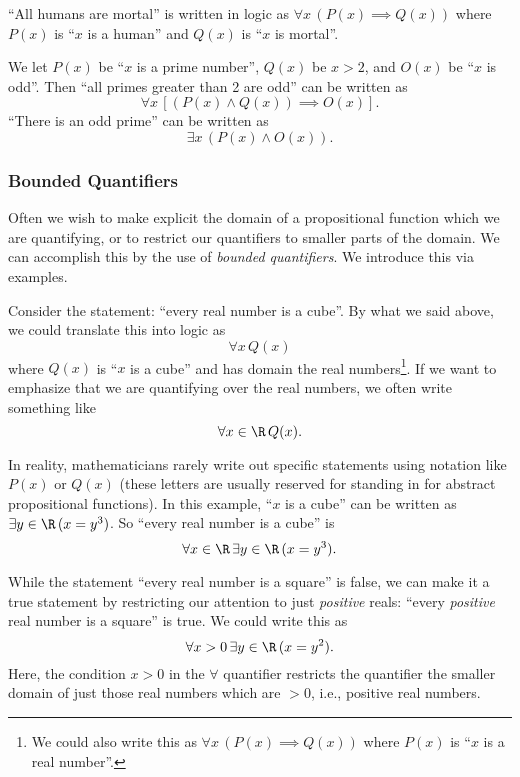 \begin{example}
``All humans are mortal'' is written in logic as $\forall x \, (P(x) \implies Q(x))$ where $P(x)$  is ``$x$ is a human'' and $Q(x)$ is ``$x$ is mortal''.
\end{example}

\begin{example}
We let $P(x)$ be ``$x$ is a prime number'', $Q(x)$ be $x > 2$, and $O(x)$ be ``$x$ is odd''. Then ``all primes greater than 2 are odd'' can be written as
\[
\forall x \, [(P(x) \land Q(x)) \implies O(x)].
\]
``There is an odd prime'' can be written as
\[
\exists x \, (P(x) \land O(x)).
\]
\end{example}

\subsubsection*{Bounded Quantifiers}

Often we wish to make explicit the domain of a propositional function which we are quantifying, or to restrict our quantifiers to smaller parts of the domain. We can accomplish this by the use of \emph{bounded quantifiers}. We introduce this via examples.

\begin{example}
Consider the statement: ``every real number is a cube''. By what we said above, we could translate this into logic as 
\[
\forall x \, Q(x)
\]
where $Q(x)$ is ``$x$ is a cube'' and has domain the real numbers\footnote{We could also write this as $\forall x \, (P(x) \implies Q(x))$ where $P(x)$ is ``$x$ is a real number''.}. If we want to emphasize that we are quantifying over the real numbers, we often write something like
\[
\forall x \in \R \, Q(x).
\]

\noindent In reality, mathematicians rarely write out specific statements using notation like $P(x)$ or $Q(x)$ (these letters are usually reserved for standing in for abstract propositional functions). In this example, ``$x$ is a cube'' can be written as $\exists y \in \R \, (x = y^3)$. So ``every real number is a cube'' is
\[
\forall x \in \R \, \exists y \in \R \, (x = y^3).
\]
\end{example}

\begin{example}
While the statement ``every real number is a square'' is false, we can make it a true statement by restricting our attention to just \emph{positive} reals: ``every \emph{positive} real number is a square'' is true. We could write this as
\[
\forall x > 0 \, \exists y \in \R  \, (x = y^2).
\]
Here, the condition $x > 0$ in the $\forall$ quantifier restricts the quantifier the smaller domain of just those real numbers which are $> 0$, i.e., positive real numbers.
\end{example}

